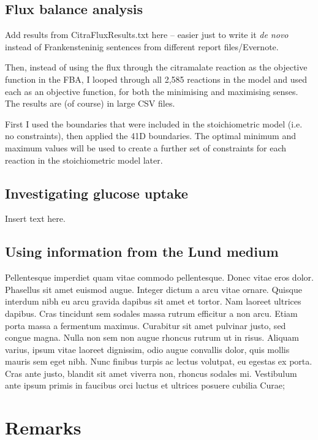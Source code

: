 \documentclass[parskip=full]{scrreprt}
\begin{document}
\section{Flux balance analysis}
\label{sec:fba}

Add results from CitraFluxResults.txt here -- easier just to write it \emph{de novo} instead of Frankensteninig sentences from different report files/Evernote.

Then, instead of using the flux through the citramalate reaction as the objective function in the FBA, I looped through all 2,585 reactions in the model and used each as an objective function, for both the minimising and maximising senses. The results are (of course) in large CSV files.

First I used the boundaries that were included in the stoichiometric model (i.e. no constraints), then applied the 41D boundaries. The optimal minimum and maximum values will be used to create a further set of constraints for each reaction in the stoichiometric model later.

\section{Investigating glucose uptake}
\label{sec:glucoseuptake}

Insert text here.

\section{Using information from the Lund medium}
\label{sec:lund}

Pellentesque imperdiet quam vitae commodo pellentesque. Donec vitae eros dolor. Phasellus sit amet euismod augue. Integer dictum a arcu vitae ornare. Quisque interdum nibh eu arcu gravida dapibus sit amet et tortor. Nam laoreet ultrices dapibus. Cras tincidunt sem sodales massa rutrum efficitur a non arcu. Etiam porta massa a fermentum maximus. Curabitur sit amet pulvinar justo, sed congue magna. Nulla non sem non augue rhoncus rutrum ut in risus. Aliquam varius, ipsum vitae laoreet dignissim, odio augue convallis dolor, quis mollis mauris sem eget nibh. Nunc finibus turpis ac lectus volutpat, eu egestas ex porta. Cras ante justo, blandit sit amet viverra non, rhoncus sodales mi. Vestibulum ante ipsum primis in faucibus orci luctus et ultrices posuere cubilia Curae;

\chapter{Remarks}
\label{ch:remarks}
\end{document}
